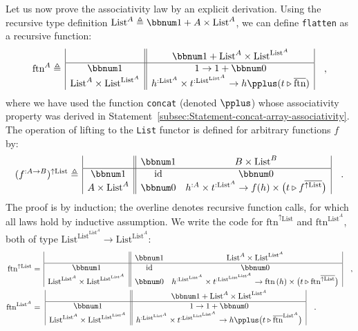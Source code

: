 Let us now prove the associativity law by an explicit derivation.
Using the recursive type definition $\text{List}^{A}\triangleq\bbnum 1+A\times\text{List}^{A}$,
we can define \lstinline!flatten! as a recursive function:
\[
\text{ftn}^{A}\triangleq\,\begin{array}{|c||c|}
 & \bbnum 1+\text{List}^{A}\times\text{List}^{\text{List}^{A}}\\
\hline \bbnum 1 & 1\rightarrow1+\bbnum 0\\
\text{List}^{A}\times\text{List}^{\text{List}^{A}} & h^{:\text{List}^{A}}\times t^{:\text{List}^{\text{List}^{A}}}\rightarrow h\pplus(t\triangleright\overline{\text{ftn}})
\end{array}\quad,
\]
where we have used the function \lstinline!concat! (denoted $\pplus$)
whose associativity property was derived in Statement~\ref{subsec:Statement-concat-array-associativity}.
The operation of lifting to the \lstinline!List! functor is defined
for arbitrary functions $f$ by:
\[
(f^{:A\rightarrow B})^{\uparrow\text{List}}\triangleq\,\begin{array}{|c||cc|}
 & \bbnum 1 & B\times\text{List}^{B}\\
\hline \bbnum 1 & \text{id} & \bbnum 0\\
A\times\text{List}^{A} & \bbnum 0 & h^{:A}\times t^{:\text{List}^{A}}\rightarrow f(h)\times\big(t\triangleright f^{\overline{\uparrow\text{List}}}\big)
\end{array}\quad.
\]
The proof is by induction; the overline denotes recursive function
calls, for which all laws hold by inductive assumption. We write the
code for $\text{ftn}^{\uparrow\text{List}}$ and $\text{ftn}^{\text{List}^{A}}$,
both of type $\text{List}^{\text{List}^{\text{List}^{A}}}\rightarrow\text{List}^{\text{List}^{A}}$:
\begin{align*}
\text{ftn}^{\uparrow\text{List}} & =\,\begin{array}{|c||cc|}
 & \bbnum 1 & \text{List}^{A}\times\text{List}^{\text{List}^{A}}\\
\hline \bbnum 1 & \text{id} & \bbnum 0\\
\text{List}^{\text{List}^{A}}\times\text{List}^{\text{List}^{\text{List}^{A}}} & \bbnum 0 & h^{:\text{List}^{\text{List}^{A}}}\times t^{:\text{List}^{\text{List}^{\text{List}^{A}}}}\rightarrow\text{ftn}\,(h)\times\big(t\triangleright\text{ftn}^{\overline{\uparrow\text{List}}}\big)
\end{array}\quad,\\
\text{ftn}^{\text{List}^{A}} & =\,\,\begin{array}{|c||c|}
 & \bbnum 1+\text{List}^{A}\times\text{List}^{\text{List}^{A}}\\
\hline \bbnum 1 & 1\rightarrow1+\bbnum 0\\
\text{List}^{\text{List}^{A}}\times\text{List}^{\text{List}^{\text{List}^{A}}} & h^{:\text{List}^{\text{List}^{A}}}\times t^{:\text{List}^{\text{List}^{\text{List}^{A}}}}\rightarrow h\pplus\big(t\triangleright\overline{\text{ftn}}^{\text{List}^{A}}\big)
\end{array}\quad.
\end{align*}

